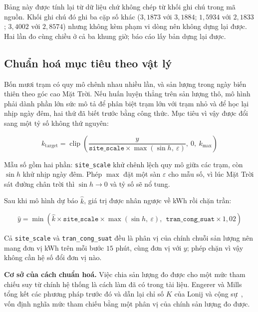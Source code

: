 Bảng này được tính lại từ dữ liệu chứ không chép từ khối ghi chú trong mã nguồn. Khối ghi chú
đó ghi ba cặp số khác ($3{,}1873$ với $3{,}1884$; $1{,}5934$ với $2{,}1833$; $3{,}4002$ với
$2{,}8574$) nhưng không kèm phạm vi dòng nên không dựng lại được. Hai lần đo cùng chiều ở cả ba
khung giờ; báo cáo lấy bản dựng lại được.

\FloatBarrier
\subsection{Chuẩn hoá mục tiêu theo vật lý}

Bốn mươi trạm có quy mô chênh nhau nhiều lần, và sản lượng trong ngày biến thiên theo góc cao
Mặt Trời. Nếu huấn luyện thẳng trên sản lượng thô, mô hình phải dành phần lớn sức mô tả để
phân biệt trạm lớn với trạm nhỏ và để học lại nhịp ngày đêm, hai thứ đã biết trước bằng
công thức. Mục tiêu vì vậy được đổi sang một tỷ số không thứ nguyên:

\begin{equation}
k_{\text{target}} = \operatorname{clip}\!\left(
\frac{y}{\texttt{site\_scale} \times \max(\sin h,\ \varepsilon)},\ 0,\ k_{\max}\right)
\end{equation}

Mẫu số gồm hai phần: \texttt{site\_scale} khử chênh lệch quy mô giữa các trạm, còn $\sin h$ khử
nhịp ngày đêm. Phép $\max$ đặt một sàn $\varepsilon$ cho mẫu số, vì lúc Mặt Trời sát đường
chân trời thì $\sin h \to 0$ và tỷ số sẽ nổ tung.

Sau khi mô hình dự báo $\hat{k}$, giá trị được nhân ngược về kWh rồi chặn trần:

\begin{equation}
\hat{y} = \min\!\left(
\hat{k} \times \texttt{site\_scale} \times \max(\sin h,\ \varepsilon),\ \
\texttt{tran\_cong\_suat} \times 1{,}02\right)
\end{equation}

Cả \texttt{site\_scale} và \texttt{tran\_cong\_suat} đều là phân vị của chính chuỗi sản lượng nên
mang đơn vị kWh trên mỗi bước $15$ phút, cùng đơn vị với $y$; phép chặn vì vậy không cần hệ số
đổi đơn vị nào.

\textbf{Cơ sở của cách chuẩn hoá.} Việc chia sản lượng đo được cho một mức tham chiếu suy từ
chính hệ thống là cách làm đã có trong tài liệu. Engerer và Mills~\cite{engerer2014kpv} tổng
kết các phương pháp trước đó và dẫn lại chỉ số $K$ của Lonij và cộng sự~\cite{lonij2012tucson},
vốn định nghĩa mức tham chiếu bằng một phân vị của chính sản lượng đo được.

